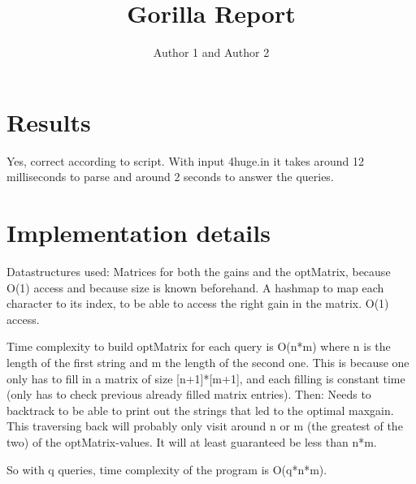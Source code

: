 \documentclass{article}
\title{Gorilla Report}
\author{Author 1 and Author 2}
\begin{document}
  \maketitle

  \section{Results}

  Yes, correct according to script.
  With input 4huge.in it takes around 12 milliseconds to parse and around 2 seconds to answer the queries.

  \section{Implementation details}

  Datastructures used: Matrices for both the gains and the optMatrix, because O(1) access and because size is known beforehand.
  A hashmap to map each character to its index, to be able to access the right gain in the matrix. O(1) access.
  
  Time complexity to build optMatrix for each query is O(n*m) where n is the length of the first string and m the length of the second one.
  This is because one only has to fill in a matrix of size [n+1]*[m+1], and each filling is constant time (only has to check previous already filled matrix entries).
  Then: Needs to backtrack to be able to print out the strings that led to the optimal maxgain.
  This traversing back will probably only visit around n or m (the greatest of the two) of the optMatrix-values.
  It will at least guaranteed be less than n*m.
  
  So with q queries, time complexity of the program is O(q*n*m).
  
\end{document}
